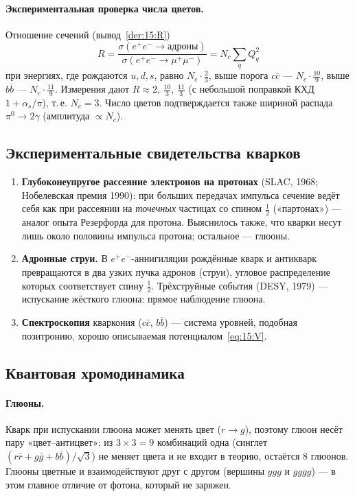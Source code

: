 \paragraph{Экспериментальная проверка числа цветов.} Отношение сечений (вывод~\ref{der:15:R})
\begin{equation}\label{eq:15:R}
  R=\frac{\sigma(e^+e^-\to\text{адроны})}{\sigma(e^+e^-\to\mu^+\mu^-)}=N_c\sum_qQ_q^2
\end{equation}
при энергиях, где рождаются $u,d,s$, равно $N_c\cdot\frac23$, выше порога $c\bar c$ — $N_c\cdot\frac{10}{9}$, выше $b\bar b$ —
$N_c\cdot\frac{11}{9}$. Измерения дают $R\approx2$, $\frac{10}{3}$, $\frac{11}{3}$ (с небольшой поправкой КХД $1+\alpha_s/\pi$), т.\,е.
$N_c=3$. Число цветов подтверждается также шириной распада $\pi^0\to2\gamma$ (амплитуда $\propto N_c$).

\subsection{Экспериментальные свидетельства кварков}

\begin{enumerate}
 \item \textbf{Глубоконеупругое рассеяние электронов на протонах} (SLAC, 1968; Нобелевская премия 1990): при больших
       передачах импульса сечение ведёт себя как при рассеянии на \emph{точечных} частицах со спином $\frac12$
       («партонах») — аналог опыта Резерфорда для протона. Выяснилось также, что кварки несут лишь около
       половины импульса протона; остальное — глюоны.
 \item \textbf{Адронные струи.} В $e^+e^-$-аннигиляции рождённые кварк и антикварк превращаются в два узких пучка адронов
       (струи), угловое распределение которых соответствует спину $\frac12$. Трёхструйные события (DESY, 1979) —
       испускание жёсткого глюона: прямое наблюдение глюона.
 \item \textbf{Спектроскопия} кваркония ($c\bar c$, $b\bar b$) — система уровней, подобная позитронию, хорошо описываемая
       потенциалом~\eqref{eq:15:V}.
\end{enumerate}

\subsection{Квантовая хромодинамика}

\paragraph{Глюоны.} Кварк при испускании глюона может менять цвет ($r\to g$), поэтому глюон несёт пару «цвет--антицвет»;
из $3\times3=9$ комбинаций одна (синглет $(r\bar r+g\bar g+b\bar b)/\sqrt3$) не меняет цвета и не входит в теорию, остаётся
$8$ глюонов. Глюоны цветные и взаимодействуют друг с другом (вершины $ggg$ и $gggg$) — в этом главное отличие
от фотона, который не заряжен.

